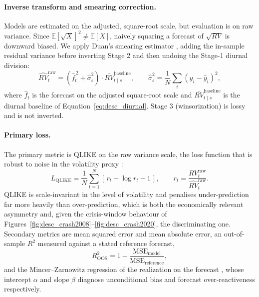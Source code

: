 \paragraph{Inverse transform and smearing correction.}
Models are estimated on the adjusted, square-root scale, but evaluation is on
raw variance. Since $\mathbb{E}[\sqrt{X}]^2 \neq \mathbb{E}[X]$, naively squaring
a forecast of $\sqrt{RV}$ is downward biased. We apply Duan's smearing estimator
\citep{Duan1983}, adding the in-sample residual variance before inverting Stage
2 and then undoing the Stage-1 diurnal division:
\begin{equation}
    \widehat{RV}^{\mathrm{raw}}_t
    = \left(\hat{f}_t^{\,2} + \hat{\sigma}^2_{\varepsilon}\right)\cdot
      \bar{RV}^{\mathrm{baseline}}_{t\mid s},
    \qquad
    \hat{\sigma}^2_{\varepsilon} = \frac{1}{N}\sum_i (y_i - \hat{y}_i)^2,
    \label{eq:desc_duan}
\end{equation}
where $\hat{f}_t$ is the forecast on the adjusted square-root scale and
$\bar{RV}^{\mathrm{baseline}}_{t\mid s}$ is the diurnal baseline of
Equation~\eqref{eq:desc_diurnal}. Stage 3 (winsorization) is lossy and is not
inverted.

\paragraph{Primary loss.}
The primary metric is QLIKE on the raw variance scale, the loss function that is
robust to noise in the volatility proxy \citep{Patton2011}:
\begin{equation}
    L_{\mathrm{QLIKE}}
    = \frac{1}{N}\sum_{t=1}^{N}\left[\, r_t - \log r_t - 1 \,\right],
    \qquad
    r_t = \frac{RV^{\mathrm{raw}}_t}{\widehat{RV}^{\mathrm{raw}}_t}.
    \label{eq:desc_qlike}
\end{equation}
QLIKE is scale-invariant in the level of volatility and penalises
under-prediction far more heavily than over-prediction, which is both the
economically relevant asymmetry and, given the crisis-window behaviour of
Figures~\ref{fig:desc_crash2008}--\ref{fig:desc_crash2020}, the discriminating
one. Secondary metrics are mean squared error and mean absolute error, an
out-of-sample $R^2$ measured against a stated reference forecast,
\begin{equation}
    R^2_{\mathrm{OOS}} = 1 - \frac{\mathrm{MSE}_{\mathrm{model}}}
                                  {\mathrm{MSE}_{\mathrm{reference}}},
    \label{eq:desc_oosr2}
\end{equation}
and the Mincer--Zarnowitz regression of the realization on the forecast
\citep{MincerZarnowitz1969}, whose intercept $\alpha$ and slope $\beta$ diagnose
unconditional bias and forecast over-reactiveness respectively.

